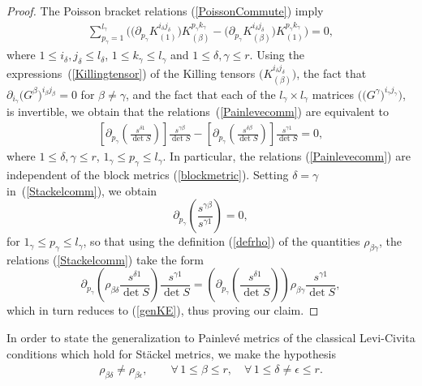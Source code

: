 \documentclass[11pt]{article}
\numberwithin{equation}{section}
\newcommand{\jbeta}{j_{\beta}}
\newcommand{\kgamma}{k_{\gamma}}
\newcommand{\pgamma}{p_{\gamma}}
\newcommand{\igamma}{i_{\gamma}}
\newcommand{\jgamma}{j_{\gamma}}
\newcommand{\lgamma}{l_{\gamma}}
\newcommand{\idelta}{i_{\delta}}
\newcommand{\jdelta}{j_{\delta}}
\newcommand{\ldelta}{l_{\delta}}
\newcommand{\ibeta}{i_{\beta}}
\begin{document}
\begin{proof}The Poisson bracket relations (\ref{PoissonCommute}) imply
\begin{gather}\label{Painlevecomm}
\sum_{\pgamma=1}^{\lgamma}\big(\big(\partial_{\pgamma} K_{(1)}^{\idelta \jdelta}\big) K_{(\beta)}^{\pgamma \kgamma}-\big(\partial_{\pgamma} K_{(\beta)}^{\idelta \jdelta}\big) K_{(1)}^{\pgamma \kgamma}\big)=0,
\end{gather}
where $1\leq \idelta, \jdelta \leq \ldelta$, $1\leq \kgamma \leq \lgamma$ and $1\leq \delta, \gamma \leq r$. Using the expressions~(\ref{Killingtensor}) of the Killing tensors $\big(K_{(\beta)}^{\idelta \jdelta}\big)$, the fact that $\partial_{\igamma}\big(G^{\beta}\big)^{\ibeta \jbeta}=0$ for $\beta \neq \gamma$, and the fact that each of the $\lgamma \times \lgamma$ matrices $\big(\big(G^{\gamma}\big)^{\igamma \jgamma}\big)$, is invertible, we obtain that the relations~(\ref{Painlevecomm}) are equivalent to
\begin{gather}\label{Stackelcomm}
\left[\partial_{\pgamma}\left(\frac{s^{\delta 1}}{\det S}\right)\right] \frac{s^{\gamma \beta}}{\det S}-\left[\partial_{\pgamma}\left(\frac{s^{\delta \beta}}{\det S}\right)\right] \frac{s^{\gamma 1}}{\det S}=0,
\end{gather}
where $1\leq \delta, \gamma \leq r$, $1_{\gamma}\leq \pgamma \leq \lgamma $. In particular, the relations (\ref{Painlevecomm}) are independent of the block metrics (\ref{blockmetric}). Setting $\delta = \gamma$ in~(\ref{Stackelcomm}), we obtain
\[
\partial_{\pgamma}\left(\frac{s^{\gamma \beta}}{s^{\gamma 1}}\right)=0,
\]
for $1_{\gamma}\leq \pgamma \leq \lgamma$, so that using the definition (\ref{defrho}) of the quantities $\rho_{\beta \gamma}$, the relations (\ref{Stackelcomm}) take the form
\[
\partial_{\pgamma}\left(\rho_{ \beta \delta}\frac{s^{\delta 1}}{\det S}\right)\frac{s^{\gamma 1}}{\det S}=\left(\partial_{\pgamma}\left(\frac{s^{\delta 1}}{\det S}\right)\right)\rho_{\beta \gamma} \frac{s^{\gamma 1}}{\det S},
\]
which in turn reduces to (\ref{genKE}), thus proving our claim.
\end{proof}

In order to state the generalization to Painlev\'e metrics of the classical Levi-Civita conditions which hold for St\"ackel metrics, we make the hypothesis
\begin{gather}\label{H}
\rho_{\beta \delta}\neq \rho_{\beta \epsilon},\qquad \forall\, 1\leq \beta \leq r,\quad \forall\, 1\leq \delta\neq \epsilon \leq r.
\end{gather}
\end{document}
